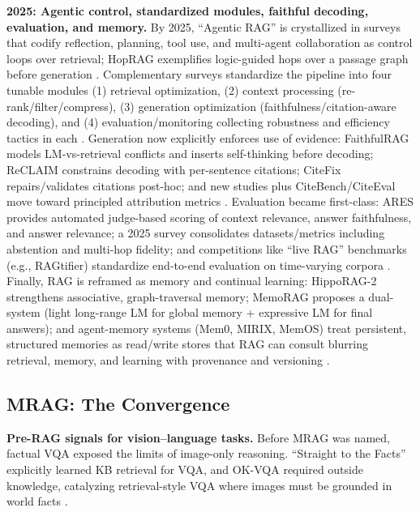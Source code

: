 \textbf{2025: Agentic control, standardized modules, faithful decoding, evaluation, and memory.}
By 2025, “Agentic RAG” is crystallized in surveys that codify reflection, planning, tool use, and multi-agent collaboration as control loops over retrieval; HopRAG exemplifies logic-guided hops over a passage graph before generation \cite{survey_agentic2025, survey_reasoning_agentic2025, hoprag2025}. Complementary surveys standardize the pipeline into four tunable modules (1) retrieval optimization, (2) context processing (re-rank/filter/compress), (3) generation optimization (faithfulness/citation-aware decoding), and (4) evaluation/monitoring collecting robustness and efficiency tactics in each \cite{knowledge_oriented_survey2025, architectures_survey2025}. Generation now explicitly enforces use of evidence: FaithfulRAG models LM-vs-retrieval conflicts and inserts self-thinking before decoding; ReCLAIM constrains decoding with per-sentence citations; CiteFix repairs/validates citations post-hoc; and new studies plus CiteBench/CiteEval move toward principled attribution metrics \cite{faithfulrag2025, reclaim2024, citefix2025, source_attribution2025, citeeval2025}. Evaluation became first-class: ARES provides automated judge-based scoring of context relevance, answer faithfulness, and answer relevance; a 2025 survey consolidates datasets/metrics including abstention and multi-hop fidelity; and competitions like “live RAG” benchmarks (e.g., RAGtifier) standardize end-to-end evaluation on time-varying corpora \cite{ares2024, survey_eval2025, ragtifier2025}. Finally, RAG is reframed as memory and continual learning: HippoRAG-2 strengthens associative, graph-traversal memory; MemoRAG proposes a dual-system (light long-range LM for global memory + expressive LM for final answers); and agent-memory systems (Mem0, MIRIX, MemOS) treat persistent, structured memories as read/write stores that RAG can consult blurring retrieval, memory, and learning with provenance and versioning \cite{hipporag2_2025, memorag2024, mem0_2025, mirix2025, memos2025}.

\subsection{MRAG: The Convergence}
\textbf{Pre-RAG signals for vision–language tasks.}  
Before MRAG was named, factual VQA exposed the limits of image-only reasoning. “Straight to the Facts” explicitly learned KB retrieval for VQA, and OK-VQA required outside knowledge, catalyzing retrieval-style VQA where images must be grounded in world facts \cite{marino2019okvqa}.

